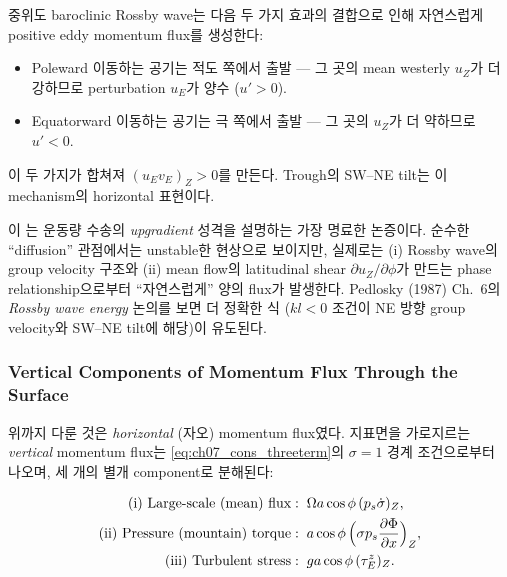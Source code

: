 \begin{theorem}\label{thm:ch07_trans_qg_thm}
중위도 baroclinic Rossby wave는 다음 두 가지 효과의 결합으로 인해 자연스럽게
positive eddy momentum flux를 생성한다:
\begin{itemize}
  \item Poleward 이동하는 공기는 적도 쪽에서 출발 — 그 곳의 mean westerly
    $u_Z$가 더 강하므로 perturbation $u_E$가 양수 ($u' > 0$).
  \item Equatorward 이동하는 공기는 극 쪽에서 출발 — 그 곳의 $u_Z$가 더
    약하므로 $u' < 0$.
\end{itemize}
이 두 가지가 합쳐져 $(u_E v_E)_Z > 0$를 만든다.  Trough의 SW--NE tilt는
이 mechanism의 horizontal 표현이다.
\end{theorem}


\begin{hisublock}
이 는 운동량 수송의 \textit{upgradient} 성격을
설명하는 가장 명료한 논증이다.  순수한 ``diffusion'' 관점에서는 unstable한
현상으로 보이지만, 실제로는 (i) Rossby wave의 group velocity 구조와 (ii)
mean flow의 latitudinal shear $\partial u_Z/\partial \phi$가 만드는 phase
relationship으로부터 ``자연스럽게'' 양의 flux가 발생한다.  Pedlosky (1987)
Ch.~6의 \textit{Rossby wave energy} 논의를 보면 더 정확한 식
($k l < 0$ 조건이 NE 방향 group velocity와 SW--NE tilt에 해당)이 유도된다.
\end{hisublock}

\subsubsection{Vertical Components of Momentum Flux Through the Surface}

위까지 다룬 것은 \textit{horizontal} (자오) momentum flux였다.  지표면을
가로지르는 \textit{vertical} momentum flux는 \eqref{eq:ch07_cons_threeterm}의
$\sigma = 1$ 경계 조건으로부터 나오며, 세 개의 별개 component로 분해된다:

\begin{align}
  \text{(i) Large-scale (mean) flux} :\;\; & \Omega a\cos\phi\,(p_s \dot\sigma)_Z,
     \label{eq:ch07_trans_vert_largescale} \\
  \text{(ii) Pressure (mountain) torque} :\;\; & a\cos\phi\,\Bigl(\sigma p_s
     \frac{\partial \Phi}{\partial x}\Bigr)_Z,
     \label{eq:ch07_trans_vert_pressure} \\
  \text{(iii) Turbulent stress} :\;\; & g a\cos\phi\,(\tau_E^z)_Z.
     \label{eq:ch07_trans_vert_turb}
\end{align}

